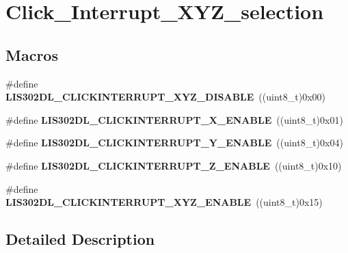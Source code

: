 \hypertarget{group___click___interrupt___x_y_z__selection}{\section{Click\-\_\-\-Interrupt\-\_\-\-X\-Y\-Z\-\_\-selection}
\label{group___click___interrupt___x_y_z__selection}
}
\subsection*{Macros}
\begin{DoxyCompactItemize}
\item 
\hypertarget{group___click___interrupt___x_y_z__selection_ga9ea11f78617ec73610b18fb772cfdae3}{\#define {\bfseries L\-I\-S302\-D\-L\-\_\-\-C\-L\-I\-C\-K\-I\-N\-T\-E\-R\-R\-U\-P\-T\-\_\-\-X\-Y\-Z\-\_\-\-D\-I\-S\-A\-B\-L\-E}~((uint8\-\_\-t)0x00)}\label{group___click___interrupt___x_y_z__selection_ga9ea11f78617ec73610b18fb772cfdae3}

\item 
\hypertarget{group___click___interrupt___x_y_z__selection_ga3b2238447a2c356ee6f2c2ced116c77b}{\#define {\bfseries L\-I\-S302\-D\-L\-\_\-\-C\-L\-I\-C\-K\-I\-N\-T\-E\-R\-R\-U\-P\-T\-\_\-\-X\-\_\-\-E\-N\-A\-B\-L\-E}~((uint8\-\_\-t)0x01)}\label{group___click___interrupt___x_y_z__selection_ga3b2238447a2c356ee6f2c2ced116c77b}

\item 
\hypertarget{group___click___interrupt___x_y_z__selection_gadb07645c09f0a6a909b22720453301a5}{\#define {\bfseries L\-I\-S302\-D\-L\-\_\-\-C\-L\-I\-C\-K\-I\-N\-T\-E\-R\-R\-U\-P\-T\-\_\-\-Y\-\_\-\-E\-N\-A\-B\-L\-E}~((uint8\-\_\-t)0x04)}\label{group___click___interrupt___x_y_z__selection_gadb07645c09f0a6a909b22720453301a5}

\item 
\hypertarget{group___click___interrupt___x_y_z__selection_ga51c917a3fec1e6d457f84eda28102deb}{\#define {\bfseries L\-I\-S302\-D\-L\-\_\-\-C\-L\-I\-C\-K\-I\-N\-T\-E\-R\-R\-U\-P\-T\-\_\-\-Z\-\_\-\-E\-N\-A\-B\-L\-E}~((uint8\-\_\-t)0x10)}\label{group___click___interrupt___x_y_z__selection_ga51c917a3fec1e6d457f84eda28102deb}

\item 
\hypertarget{group___click___interrupt___x_y_z__selection_ga571e53a795238a6fa6339452bbb68906}{\#define {\bfseries L\-I\-S302\-D\-L\-\_\-\-C\-L\-I\-C\-K\-I\-N\-T\-E\-R\-R\-U\-P\-T\-\_\-\-X\-Y\-Z\-\_\-\-E\-N\-A\-B\-L\-E}~((uint8\-\_\-t)0x15)}\label{group___click___interrupt___x_y_z__selection_ga571e53a795238a6fa6339452bbb68906}

\end{DoxyCompactItemize}


\subsection{Detailed Description}

